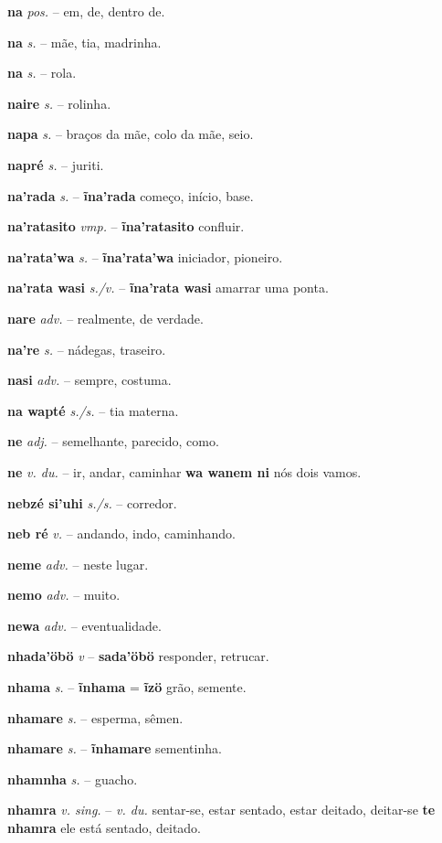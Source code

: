 \textbf{na} \textit{pos.} -- em, de, dentro de.

\textbf{na} \textit{s.} -- mãe, tia, madrinha.

\textbf{na} \textit{s.} -- rola.

\textbf{naire} \textit{s.} -- rolinha.

\textbf{napa} \textit{s.} -- braços da mãe, colo da mãe, seio.

\textbf{napré} \textit{s.} -- juriti.

\textbf{na'rada} \textit{s.} -- \textbf{ĩna'rada} começo, início, base.

\textbf{na'ratasito} \textit{vmp.} -- \textbf{ĩna'ratasito} confluir.

\textbf{na'rata'wa} \textit{s.} -- \textbf{ĩna'rata'wa} iniciador, pioneiro.

\textbf{na'rata wasi} \textit{s./v.} -- \textbf{ĩna'rata wasi} amarrar uma ponta.

\textbf{nare} \textit{adv.} -- realmente, de verdade.

\textbf{na're} \textit{s.} -- nádegas, traseiro.

\textbf{nasi} \textit{adv.} -- sempre, costuma.

\textbf{na wapté} \textit{s./s.} -- tia materna.

\textbf{ne} \textit{adj.} -- semelhante, parecido, como.

\textbf{ne} \textit{v. du.} -- ir, andar, caminhar  \textbf{wa wanem ni} nós dois vamos.

\textbf{nebzé si'uhi} \textit{s./s.} -- corredor.

\textbf{neb ré} \textit{v.} -- andando, indo, caminhando.

\textbf{neme} \textit{adv.} -- neste lugar.

\textbf{nemo} \textit{adv.} -- muito.

\textbf{newa} \textit{adv.} -- eventualidade.

\textbf{nhada'öbö} \textit{v} -- \textbf{sada'öbö} responder, retrucar.

\textbf{nhama} \textit{s.} -- \textbf{ĩnhama} = \textbf{ĩzö} grão, semente.

\textbf{nhamare} \textit{s.} -- esperma, sêmen.

\textbf{nhamare} \textit{s.} -- \textbf{ĩnhamare} sementinha.

\textbf{nhamnha} \textit{s.} -- guacho.

\textbf{nhamra} \textit{v. sing.} -- \textit{v. du.} sentar-se, estar sentado, estar deitado, deitar-se  \textbf{te nhamra} ele está sentado, deitado.


